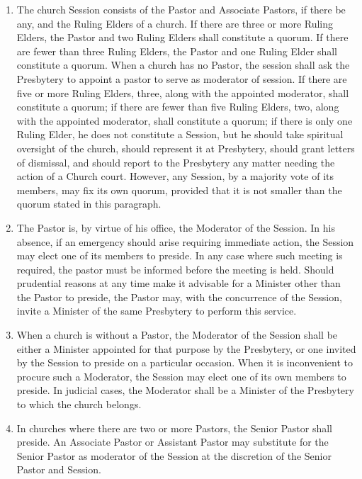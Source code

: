 \documentclass[
]{book}
\providecommand{\tightlist}{%
  \setlength{\itemsep}{0pt}\setlength{\parskip}{0pt}}
\begin{document}
\begin{enumerate}
\def\labelenumi{\arabic{enumi}.}
\tightlist
\item
  \protect\hypertarget{14}{\href{}{}}The church Session consists of the Pastor and Associate Pastors, if there be any, and the Ruling Elders of a church. If there are three or more Ruling Elders, the Pastor and two Ruling Elders shall constitute a quorum. If there are fewer than three Ruling Elders, the Pastor and one Ruling Elder shall constitute a quorum. When a church has no Pastor, the session shall ask the Presbytery to appoint a pastor to serve as moderator of session. If there are five or more Ruling Elders, three, along with the appointed moderator, shall constitute a quorum; if there are fewer than five Ruling Elders, two, along with the appointed moderator, shall constitute a quorum; if there is only one Ruling Elder, he does not constitute a Session, but he should take spiritual oversight of the church, should represent it at Presbytery, should grant letters of dismissal, and should report to the Presbytery any matter needing the action of a Church court. However, any Session, by a majority vote of its members, may fix its own quorum, provided that it is not smaller than the quorum stated in this paragraph.
\item
  The Pastor is, by virtue of his office, the Moderator of the Session. In his absence, if an emergency should arise requiring immediate action, the Session may elect one of its members to preside. In any case where such meeting is required, the pastor must be informed before the meeting is held. Should prudential reasons at any time make it advisable for a Minister other than the Pastor to preside, the Pastor may, with the concurrence of the Session, invite a Minister of the same Presbytery to perform this service.
\item
  When a church is without a Pastor, the Moderator of the Session shall be either a Minister appointed for that purpose by the Presbytery, or one invited by the Session to preside on a particular occasion. When it is inconvenient to procure such a Moderator, the Session may elect one of its own members to preside. In judicial cases, the Moderator shall be a Minister of the Presbytery to which the church belongs.
\item
  \protect\hypertarget{14.4}{\href{}{}}In churches where there are two or more Pastors, the Senior Pastor shall preside. An Associate Pastor or Assistant Pastor may substitute for the Senior Pastor as moderator of the Session at the discretion of the Senior Pastor and Session.

\end{enumerate}
\end{document}
